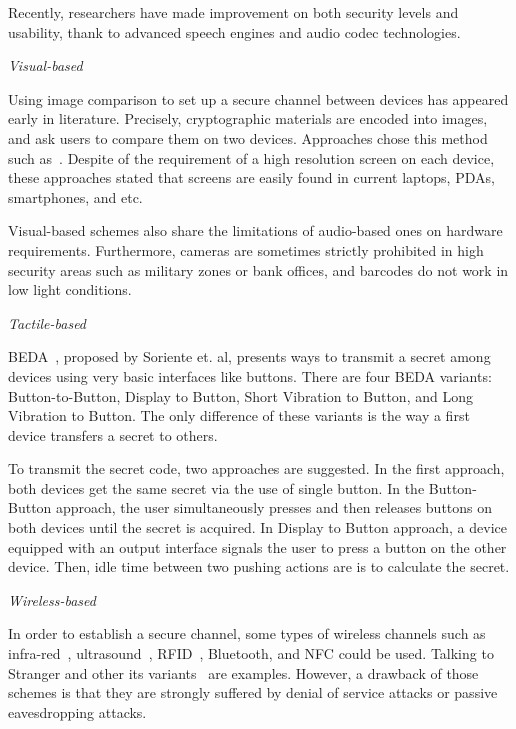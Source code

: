 Recently, researchers have made improvement on both security levels and usability, thank to advanced speech engines and audio codec technologies. 

\emph{Visual-based}

Using image comparison to set up a secure channel between devices has appeared early in literature. Precisely, cryptographic materials are encoded into images, and ask users to compare them on two devices. Approaches chose this method such as~\cite{Goodrich:2009:UAS:1509221.1509226,1425062,Perrig99hashvisualization,Ellison:2003:PSG:950191.950195,1624021}. Despite of the requirement of a high resolution screen on each device, these approaches stated that screens are easily found in current laptops, PDAs, smartphones, and etc. 

Visual-based schemes also share the limitations of audio-based ones on hardware requirements. Furthermore, cameras are sometimes strictly prohibited in high security areas such as military zones or bank offices, and barcodes do not work in low light conditions. 

\emph{Tactile-based}

BEDA~\cite{Soriente07beda:button-enabled}, proposed by Soriente et. al, presents ways to transmit a secret among devices using very basic interfaces like buttons. There are four BEDA variants: Button-to-Button, Display to Button, Short Vibration to Button, and Long Vibration to Button. The only difference of these variants is the way a first device transfers a secret to others.

To transmit the secret code, two approaches are suggested. In the first approach, both devices get the same secret via the use of single button. In the Button-Button approach, the user simultaneously presses and then releases buttons on both devices until the secret is acquired. In Display to Button approach, a device equipped with an output interface signals the user to press a button on the other device. Then, idle time between two pushing actions are is to calculate the secret. 

\emph{Wireless-based}

In order to establish a secure channel, some types of wireless channels such as infra-red~\cite{5654588}, ultrasound~\cite{Mayrhofer06anauthentication}, RFID~\cite{Amariucai:2012aa}, Bluetooth, and NFC could be used. Talking to Stranger and other its variants~\cite{5654588,Mayrhofer06anauthentication,4159919,Amariucai:2012aa} are examples. However, a drawback of those schemes is that they are strongly suffered by denial of service attacks or passive eavesdropping attacks.

